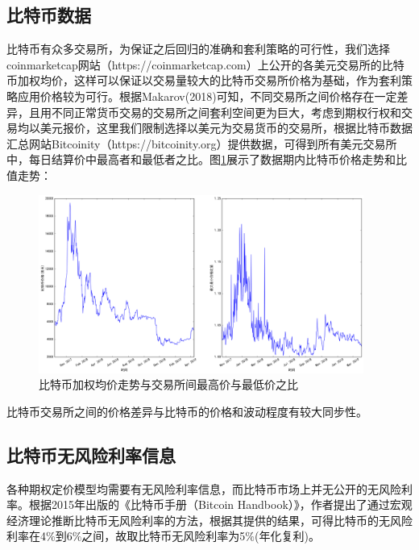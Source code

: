 \subsection{比特币数据}
\par{
    比特币有众多交易所，为保证之后回归的准确和套利策略的可行性，我们选择coinmarketcap网站（https://coinmarketcap.com）上公开的各美元交易所的比特币加权均价，这样可以保证以交易量较大的比特币交易所价格为基础，作为套利策略应用价格较为可行。根据Makarov(2018)可知，不同交易所之间价格存在一定差异，且用不同正常货币交易的交易所之间套利空间更为巨大\cite{Makarov-2018}，考虑到期权行权和交易均以美元报价，这里我们限制选择以美元为交易货币的交易所，根据比特币数据汇总网站Bitcoinity（https://bitcoinity.org）提供数据，可得到所有美元交易所中，每日结算价中最高者和最低者之比。图\ref{maxmin_ratio}展示了数据期内比特币价格走势和比值走势：
    \begin{figure}[H]
        \begin{small}
            \begin{center}
                \includegraphics[width=0.95\textwidth]{figures/maxmin_ratio_plot.png}
            \end{center}
            \caption{比特币加权均价走势与交易所间最高价与最低价之比}
            \label{maxmin_ratio}
        \end{small}
    \end{figure}
    }
    \par{比特币交易所之间的价格差异与比特币的价格和波动程度有较大同步性。}
\subsection{比特币无风险利率信息}
    \par{各种期权定价模型均需要有无风险利率信息，而比特币市场上并无公开的无风险利率。根据2015年出版的《比特币手册（Bitcoin Handbook）》\cite{WESNER2015223}，作者提出了通过宏观经济理论推断比特币无风险利率的方法，根据其提供的结果，可得比特币的无风险利率在4$\%$到6$\%$之间，故取比特币无风险利率为5$\%$(年化复利)。
    }

